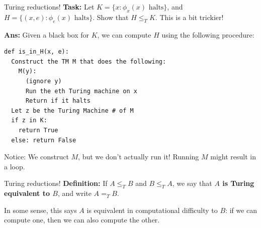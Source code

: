\documentclass{beamer}
\begin{document}
\begin{frame}[fragile]{Turing reductions!}
\textbf{Task:} Let $K = \{x: \phi_x(x) \text{ halts}\}$, and $H = \{(x, e): \phi_e(x) \text{ halts}\}$.
Show that $H \leq_T K$. This is a bit trickier!

\pause

\vspace{2mm}

\textbf{Ans:} Given a black box for $K$, we can compute $H$ using the following procedure:
\begin{verbatim}
def is_in_H(x, e):
  Construct the TM M that does the following:
    M(y):
      (ignore y)
      Run the eth Turing machine on x
      Return if it halts
  Let z be the Turing Machine # of M
  if z in K:
    return True
  else: return False
\end{verbatim}

Notice: We construct $M$, but we don't actually run it! Running $M$ might result in a loop.

\end{frame}

\begin{frame}{Turing reductions!}
\textbf{Definition:} If $A \leq_T B$ and $B \leq_T A$, we say that \textbf{$A$ is Turing equivalent to $B$}, and write $A =_T B$.

\vspace{2mm}

In some sense, this says $A$ is equivalent in computational difficulty to $B$: if we can compute one, then we can also compute the other.
\end{frame}
\end{document}
